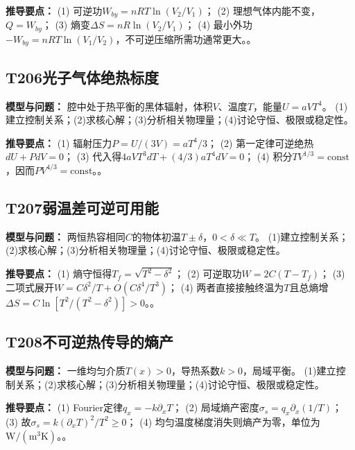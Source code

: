 \par\textbf{推导要点：} (1) 可逆功$W_{by}=nRT\ln(V_2/V_1)$； (2) 理想气体内能不变，$Q=W_{by}$； (3) 熵变$\Delta S=nR\ln(V_2/V_1)$； (4) 最小外功$-W_{by}=nRT\ln(V_1/V_2)$，不可逆压缩所需功通常更大。。

\par\medskip

\subsection*{T206\quad 光子气体绝热标度}

\textbf{模型与问题：} 腔中处于热平衡的黑体辐射，体积$V$、温度$T$，能量$U=aVT^4$。 (1)建立控制关系；(2)求核心解；(3)分析相关物理量；(4)讨论守恒、极限或稳定性。

\par\textbf{推导要点：} (1) 辐射压力$P=U/(3V)=aT^4/3$； (2) 第一定律可逆绝热$dU+PdV=0$； (3) 代入得$4aVT^3dT+(4/3)aT^4dV=0$； (4) 积分$TV^{1/3}=\mathrm{const}$，因而$PV^{4/3}=\mathrm{const}$。。

\par\medskip

\subsection*{T207\quad 弱温差可逆可用能}

\textbf{模型与问题：} 两恒热容相同$C$的物体初温$T\pm\delta$，$0<\delta\ll T$。 (1)建立控制关系；(2)求核心解；(3)分析相关物理量；(4)讨论守恒、极限或稳定性。

\par\textbf{推导要点：} (1) 熵守恒得$T_f=\sqrt{T^2-\delta^2}$； (2) 可逆取功$W=2C(T-T_f)$； (3) 二项式展开$W=C\delta^2/T+O(C\delta^4/T^3)$； (4) 两者直接接触终温为$T$且总熵增$\Delta S=C\ln[T^2/(T^2-\delta^2)]>0$。。

\par\medskip

\subsection*{T208\quad 不可逆热传导的熵产}

\textbf{模型与问题：} 一维均匀介质$T(x)>0$，导热系数$k>0$，局域平衡。 (1)建立控制关系；(2)求核心解；(3)分析相关物理量；(4)讨论守恒、极限或稳定性。

\par\textbf{推导要点：} (1) Fourier定律$q_x=-k\partial_xT$； (2) 局域熵产密度$\sigma_s=q_x\partial_x(1/T)$； (3) 故$\sigma_s=k(\partial_xT)^2/T^2\ge0$； (4) 均匀温度梯度消失则熵产为零，单位为$\mathrm{W}/(\mathrm{m}^3\mathrm K)$。。

